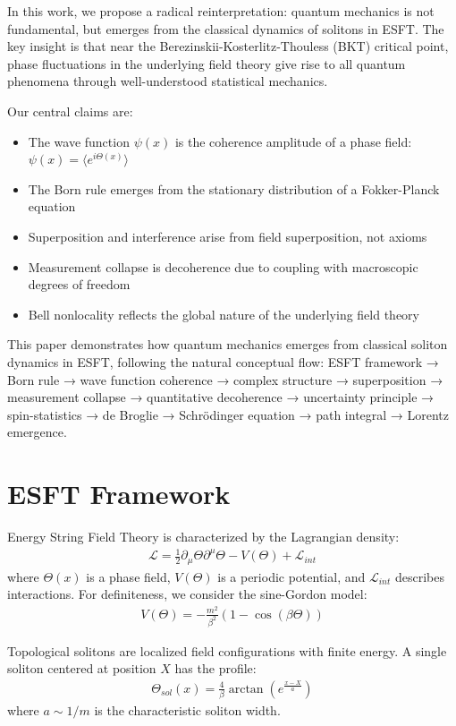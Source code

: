 ﻿\documentclass[twocolumn,showpacs,preprintnumbers,amsmath,amssymb,prd]{revtex4-2}
\begin{document}
In this work, we propose a radical reinterpretation: quantum mechanics is not fundamental, but emerges from the classical dynamics of solitons in ESFT. The key insight is that near the Berezinskii-Kosterlitz-Thouless (BKT) critical point, phase fluctuations in the underlying field theory give rise to all quantum phenomena through well-understood statistical mechanics.

Our central claims are:
\begin{itemize}
\item The wave function $\psi(x)$ is the coherence amplitude of a phase field: $\psi(x) = \langle e^{i\Theta(x)}\rangle$
\item The Born rule emerges from the stationary distribution of a Fokker-Planck equation
\item Superposition and interference arise from field superposition, not axioms
\item Measurement collapse is decoherence due to coupling with macroscopic degrees of freedom
\item Bell nonlocality reflects the global nature of the underlying field theory
\end{itemize}

This paper demonstrates how quantum mechanics emerges from classical soliton dynamics in ESFT, following the natural conceptual flow: ESFT framework → Born rule → wave function coherence → complex structure → superposition → measurement collapse → quantitative decoherence → uncertainty principle → spin-statistics → de Broglie → Schrödinger equation → path integral → Lorentz emergence.

\section{ESFT Framework}

Energy String Field Theory is characterized by the Lagrangian density:
\begin{align}
\mathcal{L} = \frac{1}{2}\partial_\mu \Theta \partial^\mu \Theta - V(\Theta) + \mathcal{L}_{int}
\end{align}
where $\Theta(x)$ is a phase field, $V(\Theta)$ is a periodic potential, and $\mathcal{L}_{int}$ describes interactions. For definiteness, we consider the sine-Gordon model:
\begin{align}
V(\Theta) = -\frac{m^2}{\beta^2}(1 - \cos(\beta\Theta))
\end{align}

Topological solitons are localized field configurations with finite energy. A single soliton centered at position $X$ has the profile:
\begin{align}
\Theta_{sol}(x) = \frac{4}{\beta}\arctan\left(e^{\frac{x-X}{a}}\right)
\end{align}
where $a \sim 1/m$ is the characteristic soliton width.
\end{document}
